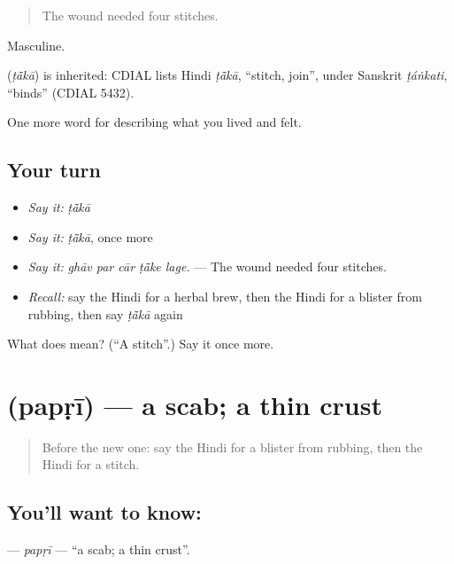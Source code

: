 \begin{quote}
The wound needed four stitches.
\end{quote}

Masculine.

\begin{cousinweb}
\textbf{} (\emph{ṭā̃kā}) is inherited: CDIAL lists Hindi \emph{ṭā̃kā}, \textquotedblleft{}stitch, join\textquotedblright{}, under Sanskrit \emph{ṭáṅkati}, \textquotedblleft{}binds\textquotedblright{} (CDIAL 5432).
\end{cousinweb}

\begin{grammarlens}[title={What you've built}]
One more word for describing what you lived and felt.
\end{grammarlens}

\subsection*{Your turn}
\begin{itemize}
\raggedright
  \item \emph{Say it:} \emph{ṭā̃kā}
  \item \emph{Say it:} \emph{ṭā̃kā}, once more
  \item \emph{Say it:} \emph{ghāv par cār ṭā̃ke lage.} — The wound needed four stitches.
  \item \emph{Recall:} say the Hindi for a herbal brew, then the Hindi for a blister from rubbing, then say \emph{ṭā̃kā} again
\end{itemize}

\begin{tcolorbox}[breakable,colback=teal!4,colframe=teal!35!black,title={Before you move on}]
What does  mean? (\textquotedblleft{}A stitch\textquotedblright{}.) Say it once more.
\end{tcolorbox}
\section[\texorpdfstring{\hi{पपड़ी} (papṛī)}{पपड़ी (papṛī)}]{ (papṛī) — a scab; a thin crust}

\label{lesson:HI-C490-papri}



\begin{quote}
Before the new one: say the Hindi for a blister from rubbing, then the Hindi for a stitch.
\end{quote}

\subsection*{You'll want to know: }
\textbf{} — \emph{papṛī} — \textquotedblleft{}a scab; a thin crust\textquotedblright{}.


